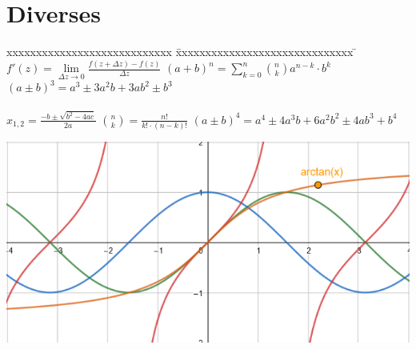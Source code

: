\section{Diverses}
\begin{tabbing}
	xxxxxxxxxxxxxxxxxxxxxxxxxxxx \= xxxxxxxxxxxxxxxxxxxxxxxxxxxxxx \= \kill
 	$f'(z) = \lim \limits_{\Delta z \rightarrow 0} \frac{f(z + \Delta z) -
	f(z)}{\Delta z}$ \> $(a + b)^n = \sum_{k=0}^{n} \binom n k a^{n-k} \cdot b^k$ \>
	$(a \pm b)^3 =a^3 \pm  3 a^{2} b + 3 a b^2 \pm b^3 $\\ \\
	$x_{1,2} = \frac{-b \pm \sqrt{b^2 - 4ac}}{2a}$ \> $\binom n k = \frac{n!}{k!
	\cdot (n-k)!}$ \> $(a \pm b)^4 =a^4 \pm  4 a^{3} b + 6a^2b^2 \pm 4 a b^3 +
	b^4$\\ 
\end{tabbing}

\includegraphics[width=0.4\linewidth]{./bilder/winkelfunktionen.png}



